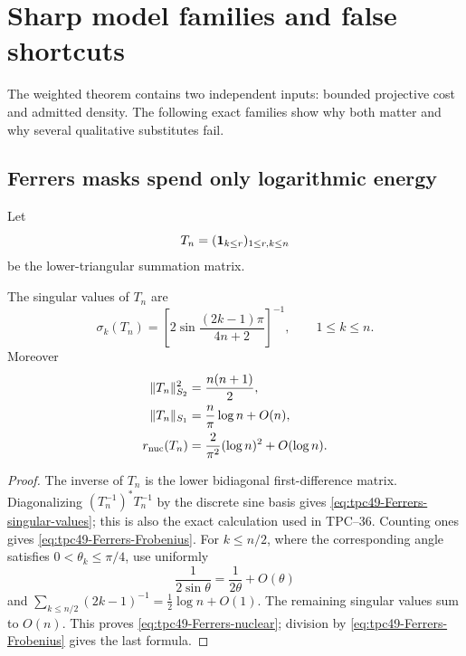 \section{Sharp model families and false shortcuts}
\label{sec:tpc49-models}

The weighted theorem contains two independent inputs: bounded
projective cost and admitted density.  The following exact families
show why both matter and why several qualitative substitutes fail.

\subsection{Ferrers masks spend only logarithmic energy}

Let
\begin{equation}
 T_n=(\mathbf 1_{k\le r})_{1\le r,k\le n}
 \label{eq:tpc49-Ferrers-matrix}
\end{equation}
be the lower-triangular summation matrix.

\begin{proposition}
\label{prop:tpc49-Ferrers-distortion}
The singular values of \(T_n\) are
\begin{equation}
 \sigma_k(T_n)
 =\left[2\sin\frac{(2k-1)\pi}{4n+2}\right]^{-1},
 \qquad1\le k\le n.
 \label{eq:tpc49-Ferrers-singular-values}
\end{equation}
Moreover
\begin{align}
 \|T_n\|_{S_2}^2&=\frac{n(n+1)}2,
 \label{eq:tpc49-Ferrers-Frobenius}\\
 \|T_n\|_{S_1}&=\frac n\pi\log n+O(n),
 \label{eq:tpc49-Ferrers-nuclear}\\
 r_{\rm nuc}(T_n)
 &=\frac{2}{\pi^2}(\log n)^2+O(\log n).
 \label{eq:tpc49-Ferrers-effective-rank}
\end{align}
\end{proposition}

\begin{proof}
The inverse of \(T_n\) is the lower bidiagonal first-difference matrix.
Diagonalizing \((T_n^{-1})^*T_n^{-1}\) by the discrete sine basis gives
\eqref{eq:tpc49-Ferrers-singular-values}; this is also the exact
calculation used in TPC--36.  Counting ones gives
\eqref{eq:tpc49-Ferrers-Frobenius}.  For
\(k\le n/2\), where the corresponding angle satisfies
\(0<\theta_k\le\pi/4\), use uniformly
\begin{equation}
 \frac1{2\sin\theta}
 =\frac1{2\theta}+O(\theta)
 \label{eq:tpc49-sine-expansion}
\end{equation}
and
\(\sum_{k\le n/2}(2k-1)^{-1}=\tfrac12\log n+O(1)\).
The remaining singular values sum to \(O(n)\).  This proves
\eqref{eq:tpc49-Ferrers-nuclear}; division by
\eqref{eq:tpc49-Ferrers-Frobenius} gives the last formula.
\end{proof}

